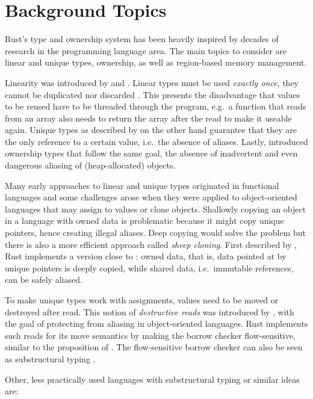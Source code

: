 \section{Background Topics}

Rust's type and ownership system has been heavily inspired by decades of
research in the programming language area. The main topics to consider are
linear and unique types, ownership, as well as region-based memory management.

Linearity was introduced by \citet{girard} and \citet{Wadler90lineartypes}.
Linear types must be used \emph{exactly once}, they cannot be duplicated nor
discarded \cite{use-once}. This presents the disadvantage that values to be
reused have to be threaded through the program, e.g.~a function that reads from
an array also needs to return the array after the read to make it useable again.
Unique types as described by \citet{alias-free-pointers} on the other hand
guarantee that they are the only reference to a certain value, i.e.~the absence
of aliases. Lastly, \citet{ownership-types} introduced ownership types that
follow the same goal, the absence of inadvertent and even dangerous aliasing of
(heap-allocated) objects.

Many early approaches to linear and unique types originated in functional
languages and some challenges arose when they were applied to object-oriented
languages that may assign to values or clone objects. Shallowly copying an
object in a language with owned data is problematic because it might copy unique
pointers, hence creating illegal aliases. Deep copying would solve the problem
but there is also a more efficient approach called \emph{sheep cloning}. First
described by \citet{dynamic-alias-protection}, Rust implements a version close
to \cite{sheep-cloning}: owned data, that is, data pointed at by unique pointers
is deeply copied, while shared data, i.e.~immutable references, can be safely
aliased.

To make unique types work with assignments, values need to be moved or destroyed
after read. This notion of \emph{destructive reads} was introduced by
\citet{islands-alias-protection}, with the goal of protecting from aliasing in
object-oriented languages. Rust implements such reads for its move semantics by
making the borrow checker flow-sensitive, similar to the proposition of
\citet{alias-burying}. The flow-sensitive borrow checker can also be seen as
substructural typing \cite{oxide}.

Other, less practically used languages with substructural typing or
similar ideas are:

